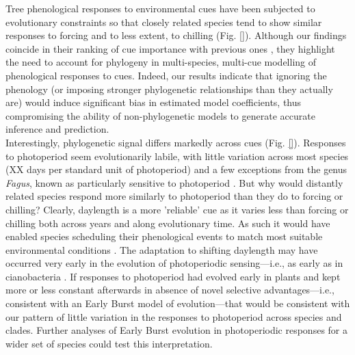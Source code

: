 \documentclass{article}\usepackage[]{graphicx}\usepackage[]{color}
\begin{document}
Tree phenological responses to environmental cues have been subjected to evolutionary constraints so that closely related species tend to show similar responses to forcing and to less extent, to chilling (Fig. \ref{}). Although our findings coincide in their ranking of cue importance with previous ones \citep{ettinger2020}, they highlight the need to account for phylogeny in multi-species, multi-cue modelling of phenological responses to cues. Indeed, our results indicate that ignoring the phenology (or imposing stronger phylogenetic relationships than they actually are) would induce significant bias in estimated model coefficients, thus compromising the ability of non-phylogenetic models to generate accurate inference and prediction.\\ 

Interestingly, phylogenetic signal differs markedly across cues (Fig. \ref{}). Responses to photoperiod seem evolutionarily labile, with little variation across most species (XX days per standard unit of photoperiod) and a few exceptions from the genus \emph{Fagus}, known as particularly sensitive to photoperiod \citep{fu2019}. But why would distantly related species respond more similarly to photoperiod than they do to forcing or chilling? Clearly, daylength is a more 'reliable' cue as it varies less than forcing or chilling both across years and along evolutionary time. As such it would have enabled species scheduling their phenological events to match most suitable environmental conditions \citep{jackson2009plant}. The adaptation to shifting daylength may have occurred very early in the evolution of photoperiodic sensing---i.e., as early as in cianobacteria \citep{hut2011evolution, serrano2017evolution}. If responses to photoperiod had evolved early in plants and kept more or less constant afterwards in absence of novel selective advantages---i.e., consistent with an Early Burst model of evolution---that would be consistent with our pattern of little variation in the responses to photoperiod across species and clades. Further analyses of Early Burst evolution in photoperiodic responses for a wider set of species could test this interpretation.   
\end{document}
